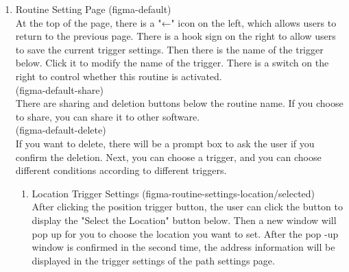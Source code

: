 \begin{enumerate}[label=\arabic*.]
\begin{enumerate}[label=\alph*]
              \item Routine Setting Page
                    (figma-default)\\
                    At the top of the page, there is a "←" icon on the left, which allows users to return to the previous page. There is a hook sign on the right to allow users to save the current trigger settings. Then there is the name of the trigger below. Click it to modify the name of the trigger. There is a switch on the right to control whether this routine is activated. \\
                    (figma-default-share)\\
                    There are sharing and deletion buttons below the routine name. If you choose to share, you can share it to other software. \\
                    (figma-default-delete)\\
                    If you want to delete, there will be a prompt box to ask the user if you confirm the deletion. Next, you can choose a trigger, and you can choose different conditions according to different triggers.\\
                    \begin{enumerate}
                        \item  Location Trigger Settings
                        (figma-routine-settings-location/selected)\\
                              After clicking the position trigger button, the user can click the button to display the "Select the Location" button below. Then a new window will pop up for you to choose the location you want to set. After the pop -up window is confirmed in the second time, the address information will be displayed in the trigger settings of the path settings page.\\

\end{enumerate}
\end{enumerate}
\end{enumerate}
